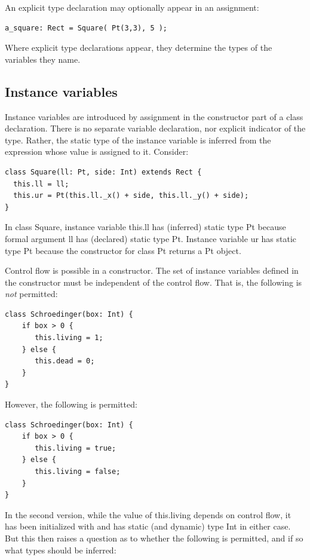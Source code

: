 \documentclass[11pt]{article}
\begin{document}
An explicit type declaration may optionally appear in an assignment: 

\begin{verbatim}
a_square: Rect = Square( Pt(3,3), 5 );
\end{verbatim}

Where explicit type declarations appear, they determine the types of
the variables they name.  

\subsection{Instance variables}

Instance variables are introduced by assignment in the constructor part
of a class declaration.  There is no separate variable declaration,
nor explicit indicator of the type.  Rather, the static type of the
instance variable is 
inferred from the expression whose value is assigned to it.  Consider: 

\begin{verbatim}
class Square(ll: Pt, side: Int) extends Rect {
  this.ll = ll;
  this.ur = Pt(this.ll._x() + side, this.ll._y() + side);
}
\end{verbatim}

In class Square, instance variable this.ll  has (inferred) static type Pt because
formal argument ll has (declared) static type Pt.  Instance variable
ur has static type Pt because the constructor for class Pt returns 
a Pt object. 

Control flow is possible in a constructor.   The set of instance
variables defined in the constructor must be independent of 
the control flow.  That is, the following is \emph{not} permitted: 

\begin{verbatim}
class Schroedinger(box: Int) {
    if box > 0 {
       this.living = 1; 
    } else {
       this.dead = 0;
    }
}
\end{verbatim}

However, the following is permitted: 

\begin{verbatim}
class Schroedinger(box: Int) {
    if box > 0 {
       this.living = true; 
    } else {
       this.living = false;
    }
}
\end{verbatim}

In the second version, while the value of this.living depends on
control flow, it has been initialized with and has static (and
dynamic) type Int in either case.   But this then raises a question
as to whether the following is permitted, and if so what types should
be inferred: 
\end{document}
